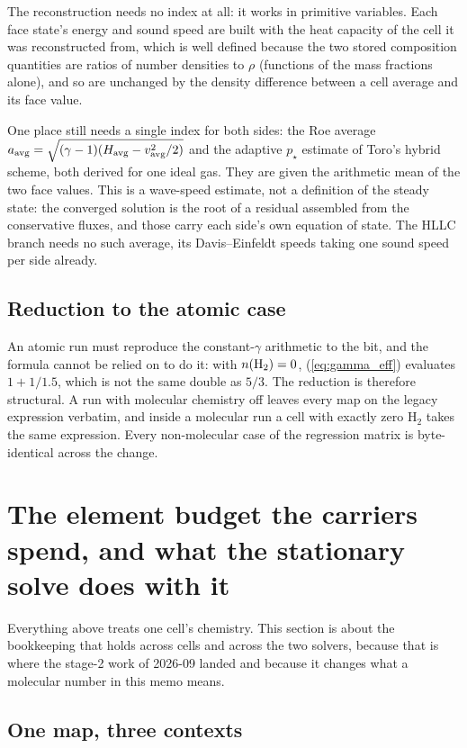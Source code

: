 \documentclass[english,a4paper]{my_memo}
\begin{document}
The reconstruction needs no index at all: it works in primitive variables. Each
face state's energy and sound speed are built with the heat capacity of the cell
it was reconstructed from, which is well defined because the two stored
composition quantities are ratios of number densities to $\rho$ (functions of
the mass fractions alone), and so are unchanged by the density difference
between a cell average and its face value.

One place still needs a single index for both sides: the Roe average
$a_{\rm avg} = \sqrt{(\gamma-1)(H_{\rm avg} - v_{\rm avg}^2/2)}$ and the
adaptive $p_\star$ estimate of Toro's hybrid scheme, both derived for one
ideal gas.
They are given the arithmetic mean of the two face values. This is a wave-speed
estimate, not a definition of the steady state: the converged solution is the
root of a residual assembled from the conservative fluxes, and those carry each
side's own equation of state. The HLLC branch needs no such average, its
Davis--Einfeldt speeds taking one sound speed per side already.

\subsection{Reduction to the atomic case}

An atomic run must reproduce the constant-$\gamma$ arithmetic to the bit, and
the formula cannot be relied on to do it: with $n({\rm H_2}) = 0$,
(\ref{eq:gamma_eff}) evaluates $1 + 1/1.5$, which is not the same double as
$5/3$. The reduction is therefore structural. A run with molecular chemistry
off leaves every map on the legacy expression verbatim, and inside a molecular
run a cell with exactly zero H$_2$ takes the same expression. Every
non-molecular case of the regression matrix is byte-identical across the
change.
\section{The element budget the carriers spend, and what the
stationary solve does with it}
\label{sec:budget}

Everything above treats one cell's chemistry. This section is about the
bookkeeping that holds across cells and across the two solvers, because that
is where the stage-2 work of 2026-09 landed and because it changes what a
molecular number in this memo means.

\subsection{One map, three contexts}
\end{document}

